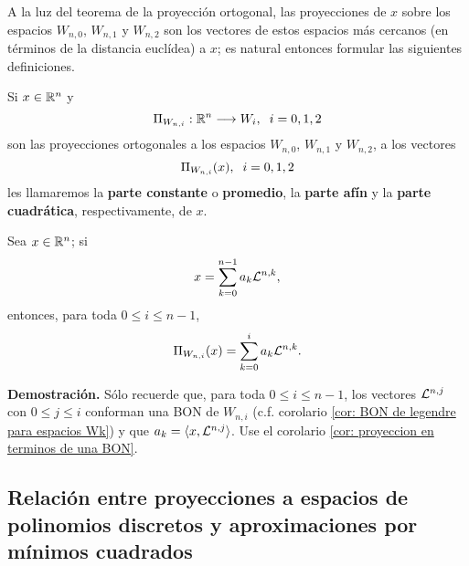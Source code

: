 \noindent A la luz del teorema de la proyección ortogonal, 
las proyecciones de $x$ sobre los espacios 
$W_{n,0}$, $W_{n,1}$
y $W_{n,2}$ son los vectores
de estos espacios más cercanos (en términos de la 
distancia euclídea)
a $x$; es natural entonces formular
las siguientes definiciones.


\begin{defi}
Si $x \in \mathbb{R}^{n}$ y
\begin{equation}
\label{eq0: 5Dic}
\Pi_{W_{n,i}}: \mathbb{R} ^{n}  \longrightarrow W_{i}, \hspace{0.2cm}
i=0,1,2
\end{equation}
son las proyecciones ortogonales
a los espacios 
$W_{n,0}$, $W_{n,1}$ y $W_{n,2}$, a los vectores
\[
\Pi_{W_{n,i}}(x), \hspace{0.2cm} i=0,1,2
\]
les llamaremos la \textbf{parte constante}
o \textbf{promedio}, la \textbf{parte afín} y la
\textbf{parte cuadrática}, respectivamente, de $x$.
\end{defi}

\begin{prop}
Sea $x \in \mathbb{R}^{n}$; si
\[
x= \sum\limits_{k=0}^{n-1}a_{k}\mathcal{L}^{n,k},
\]
entonces, para toda $0 \leq i \leq n-1$,
\[
\Pi_{W_{n,i}}(x)=\sum\limits_{k=0}^{i}a_{k}\mathcal{L}^{n,k}.
\]
\end{prop}
\textbf{Demostración.}
Sólo recuerde que, para toda $0 \leq i \leq n-1$,
los vectores $\mathcal{L}^{n, j}$ con $0 \leq j \leq i$
conforman una BON de $W_{n,i}$
(c.f. corolario \ref{cor: BON de legendre para espacios Wk}) y
que $a_{k}= \langle x, \mathcal{L}^{n,j} \rangle$.
Use el corolario \ref{cor: proyeccion en terminos de una BON}.
\QEDB 
\vspace{0.2cm}










\subsection{Relación entre proyecciones a espacios de polinomios discretos y aproximaciones por mínimos cuadrados}
\label{Relación entre proyecciones a espacios de polinomios discretos y aproximaciones por mínimos cuadrados}

